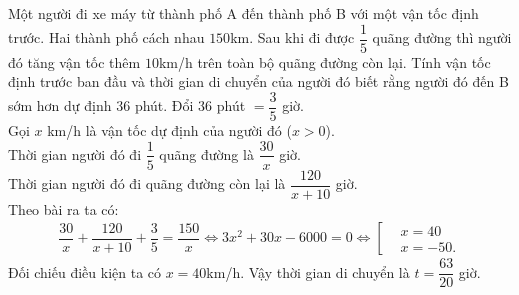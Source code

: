 \begin{ex}%
	Một người đi xe máy từ thành phố A đến thành phố B với một vận tốc định trước. Hai thành phố cách nhau $150$km. Sau khi đi được $\dfrac{1}{5}$ quãng đường thì người đó tăng vận tốc thêm $10$km/h trên toàn bộ quãng đường còn lại. Tính vận tốc định trước ban đầu và thời gian di chuyển của người đó biết rằng người đó đến B sớm hơn dự định $36$ phút. 
\loigiai
{Đổi $36$ phút $= \dfrac{3}{5}$ giờ. \\
	Gọi $x$ km/h là vận tốc dự định của người đó ($x>0$). \\
	Thời gian người đó đi $\dfrac{1}{5}$ quãng đường là $\dfrac{30}{x}$ giờ.\\
	Thời gian người đó đi quãng đường còn lại là $\dfrac{120}{x+10}$ giờ.\\
	Theo bài ra ta có:
		\begin{eqnarray*} \dfrac{30}{x}+\dfrac{120}{x+10}+\dfrac{3}{5}=\dfrac{150}{x} \Leftrightarrow 3x^2 + 30x - 6000 =0 \Leftrightarrow \left[\begin{aligned} &x=40 \\ &x=-50. \end{aligned}\right.
					\end{eqnarray*}
	Đối chiếu điều kiện ta có $x=40$km/h. Vậy thời gian di chuyển là $t=\dfrac{63}{20}$ giờ.
	}
\end{ex}
